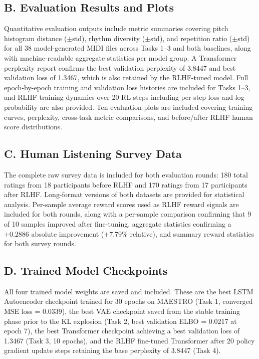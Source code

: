\documentclass[conference]{IEEEtran}
\begin{document}
\subsection*{B. Evaluation Results and Plots}
Quantitative evaluation outputs include metric summaries covering pitch
histogram distance ($\pm$std), rhythm diversity ($\pm$std), and repetition
ratio ($\pm$std) for all 38 model-generated MIDI files across Tasks 1--3 and
both baselines, along with machine-readable aggregate statistics per model
group. A Transformer perplexity report confirms the best validation perplexity
of 3.8447 and best validation loss of 1.3467, which is also retained by the
RLHF-tuned model. Full epoch-by-epoch training and validation loss histories
are included for Tasks 1--3, and RLHF training dynamics over 20 RL steps
including per-step loss and log-probability are also provided. Ten evaluation
plots are included covering training curves, perplexity, cross-task metric
comparisons, and before/after RLHF human score distributions.

\subsection*{C. Human Listening Survey Data}
The complete raw survey data is included for both evaluation rounds: 180 total
ratings from 18 participants before RLHF and 170 ratings from 17 participants
after RLHF. Long-format versions of both datasets are provided for statistical
analysis. Per-sample average reward scores used as RLHF reward signals are
included for both rounds, along with a per-sample comparison confirming that
9 of 10 samples improved after fine-tuning, aggregate statistics confirming a
$+0.2886$ absolute improvement ($+7.79\%$ relative), and summary reward
statistics for both survey rounds.

\subsection*{D. Trained Model Checkpoints}
All four trained model weights are saved and included. These are the best LSTM
Autoencoder checkpoint trained for 30 epochs on MAESTRO (Task 1, converged MSE
loss = 0.0339), the best VAE checkpoint saved from the stable training phase
prior to the KL explosion (Task 2, best validation ELBO = 0.0217 at epoch 7),
the best Transformer checkpoint achieving a best validation loss of 1.3467
(Task 3, 10 epochs), and the RLHF fine-tuned Transformer after 20 policy
gradient update steps retaining the base perplexity of 3.8447 (Task 4).
\end{document}
